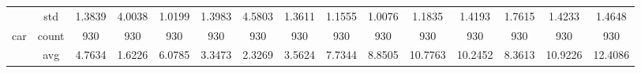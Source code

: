 \begin{table}[htbp]
{\begin{tabular}{rcccc|c|c|c|c|c|ccccc}
			                                                                               & std                                    & 1.3839                                                                             & 4.0038                                                                    & 1.0199                                                                    & 1.3983                                         & 4.5803                                                                    & 1.3611                                       & 1.1555                                      & 1.0076                                         & 1.1835                                         & 1.4193                                          & 1.7615                                          & 1.4233                                         & 1.4648                                         \\
			car                                                                            & count                                  & 930                                                                                & 930                                                                       & 930                                                                       & 930                                            & 930                                                                       & 930                                          & 930                                         & 930                                            & 930                                            & 930                                             & 930                                             & 930                                            & 930                                            \\
			                                                                               & avg                                    & 4.7634                                                                             & \cellcolor[rgb]{ .776,  .937,  .808}\textcolor[rgb]{ 0,  .38,  0}{1.6226} & 6.0785                                                                    & 3.3473                                         & 2.3269                                                                    & 3.5624                                       & 7.7344                                      & 8.8505                                         & 10.7763                                        & 10.2452                                         & 8.3613                                          & 10.9226                                        & 12.4086                                        \\

\end{tabular}}
\end{table}

